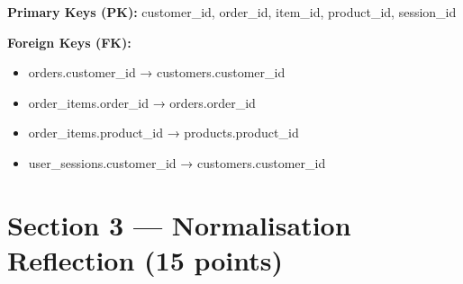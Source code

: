\documentclass[12pt,a4paper]{article}
\begin{document}
\vspace{0.5cm}
\textbf{Primary Keys (PK):} customer\_id, order\_id, item\_id, product\_id, session\_id

\vspace{0.3cm}
\textbf{Foreign Keys (FK):}
\begin{itemize}[leftmargin=*,noitemsep,topsep=3pt]
    \item orders.customer\_id → customers.customer\_id
    \item order\_items.order\_id → orders.order\_id
    \item order\_items.product\_id → products.product\_id
    \item user\_sessions.customer\_id → customers.customer\_id
\end{itemize}

\section{Section 3 — Normalisation Reflection (15 points)}
\end{document}
